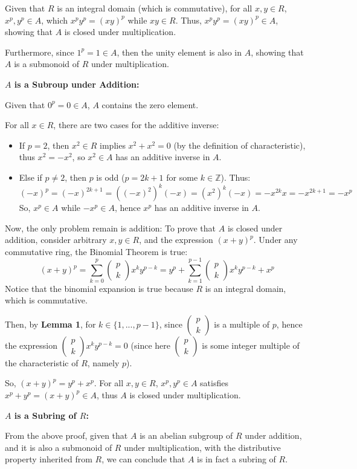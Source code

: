 \documentclass{article}
\begin{document}
Given that $R$ is an integral domain (which is commutative), for all $x,y\in R$, $x^p,y^p\in A$, which $x^py^p = (xy)^p$ while $xy\in R$.
Thus, $x^py^p = (xy)^p\in A$, showing that $A$ is closed under multiplication.

Furthermore, since $1^p=1\in A$, then the unity element is also in $A$, showing that $A$ is a submonoid of $R$ under multiplication.

\hfill

\textbf{$A$ is a Subroup under Addition:}

Given that $0^p = 0 \in A$, $A$ contains the zero element.

For all $x\in R$, there are two cases for the additive inverse:
\begin{itemize}
    \item If $p=2$, then $x^2\in R$ implies $x^2+x^2=0$ (by the definition of characteristic), thus $x^2=-x^2$, so $x^2\in A$ has an additive inverse in $A$.
    \item Else if $p\neq 2$, then $p$ is odd ($p=2k+1$ for some $k\in\mathbb{Z}$). Thus:
    $$(-x)^p = (-x)^{2k+1} = ((-x)^2)^k(-x) = (x^2)^k(-x) = -x^{2k}x = -x^{2k+1}=-x^p$$
    So, $x^p\in A$ while $-x^p\in A$, hence $x^p$ has an additive inverse in $A$.
\end{itemize}

Now, the only problem remain is addition: To prove that $A$ is closed under addition, consider arbitrary $x,y\in R$, and the expression $(x+y)^p$.
Under any commutative ring, the Binomial Theorem is true:
$$(x+y)^p = \sum_{k=0}^{p}\begin{pmatrix}
    p\\k
\end{pmatrix}x^ky^{p-k} = y^p + \sum_{k=1}^{p-1}\begin{pmatrix}
    p\\k
\end{pmatrix}x^ky^{p-k} + x^p$$
Notice that the binomial expansion is true because $R$ is an integral domain, which is commutative. 

Then, by \textbf{Lemma 1}, for $k\in\{1,...,p-1\}$, since $\begin{pmatrix}
    p\\k
\end{pmatrix}$ is a multiple of $p$, hence the expression $\begin{pmatrix}
    p\\k
\end{pmatrix}x^ky^{p-k}=0$ (since here $\begin{pmatrix}p\\k \end{pmatrix}$ is some integer multiple of the characteristic of $R$, namely $p$).

So, $(x+y)^p = y^p + x^p$. For all $x,y\in R$, $x^p, y^p\in A$ satisfies $x^p+y^p = (x+y)^p \in A$, thus $A$ is closed under multiplication.

\hfill

\textbf{$A$ is a Subring of $R$:}

From the above proof, given that $A$ is an abelian subgroup of $R$ under addition, and it is also a submonoid of $R$ under multiplication,
with the distributive property inherited from $R$, we can conclude that $A$ is in fact a subring of $R$.
\end{document}
